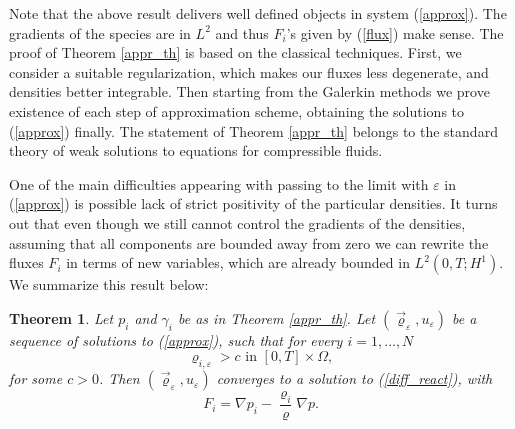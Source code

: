 \documentclass[11pt]{article}
\newtheorem{tw}{Theorem}
\numberwithin{equation}{section}
\numberwithin{tw}{section}
\begin{document}
Note that the above result delivers well defined objects in system (\ref{approx}). The gradients of the species are in $L^2$ and thus $F_i$'s given by (\ref{flux}) make sense. The proof of Theorem \ref{appr_th} is based on the classical techniques. First, we consider a suitable regularization, which makes our fluxes less degenerate, and densities better integrable. Then starting from the Galerkin methods we prove existence of each step of approximation scheme, obtaining the solutions to (\ref{approx}) finally. The statement of Theorem \ref{appr_th} belongs to the standard theory of weak solutions to equations for compressible fluids. 

One of the main difficulties appearing with passing to the limit with $\varepsilon$ in (\ref{approx}) is possible lack of strict positivity of the particular densities. It turns out that even though we still cannot control the gradients of the densities, assuming that all components are bounded away from zero we can rewrite the fluxes $F_i$ in terms of new variables, which are already bounded in $L^2(0,T;H^1)$. We summarize this result below:
\begin{tw}\label{positive_th}
    Let $p_i$ and $\gamma_i$ be as in Theorem \ref{appr_th}. Let $(\vec\varrho_\varepsilon,u_\varepsilon)$ be a sequence of solutions to (\ref{approx}), such that for every $i=1,\dots,N$
    \[ \varrho_{i,\varepsilon} >c \mbox{ \ \ in \ \ }  [0,T]\times \Omega , \] 
    for some $c>0$. Then $(\vec\varrho_\varepsilon,u_\varepsilon)$ converges to a solution to (\ref{diff_react}), with 
    \[ F_i = \nabla p_i - \frac{\varrho_i}{\varrho}\nabla p. \]
\end{tw}
\end{document}
